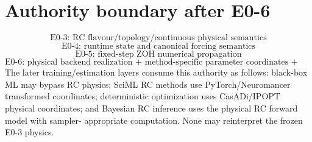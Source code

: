 \documentclass[11pt]{article}
\begin{document}
\section{Authority boundary after E0-6}
\[
\boxed{\text{E0-3: RC flavour/topology/continuous physical semantics}}
\]
\[
\boxed{\text{E0-4: runtime state and canonical forcing semantics}}
\]
\[
\boxed{\text{E0-5: fixed-step ZOH numerical propagation}}
\]
\[
\boxed{\text{E0-6: physical backend realization + method-specific parameter coordinates + parity}}
\]
The later training/estimation layers consume this authority as follows: black-box
ML may bypass RC physics; SciML RC methods use PyTorch/Neuromancer transformed
coordinates; deterministic optimization uses CasADi/IPOPT physical coordinates;
and Bayesian RC inference uses the physical RC forward model with sampler-
appropriate computation. None may reinterpret the frozen E0-3 physics.



\end{document}
